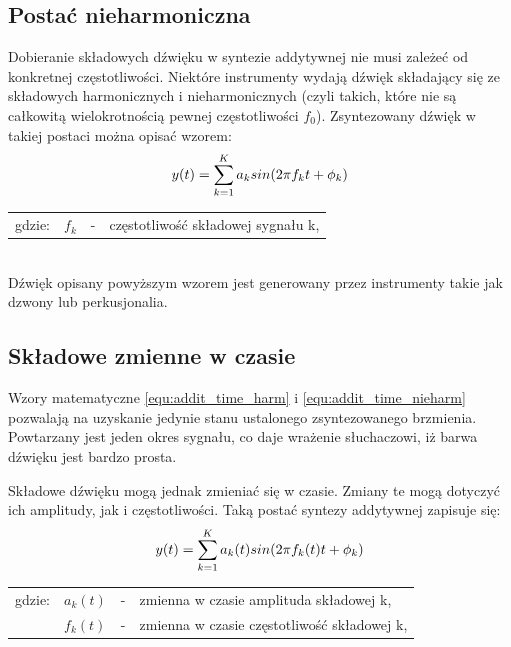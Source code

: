 \subsection{Postać nieharmoniczna} \label{pos_nieharm}
Dobieranie składowych dźwięku w syntezie addytywnej nie musi zależeć od konkretnej częstotliwości. Niektóre instrumenty wydają dźwięk składający się ze składowych harmonicznych i nieharmonicznych (czyli takich, które nie są całkowitą wielokrotnością pewnej częstotliwości $f_{0}$). Zsyntezowany dźwięk w takiej postaci można opisać wzorem:
\begin{equation} \label{equ:addit_time_nieharm}
y(t) = \sum_{k=1}^{K} a_{k}sin(2\pi f_{k}t + \phi_{k})  \\  
\end{equation}
\begin{tabular}{ l l l l}
	gdzie: 	&	$f_{k}$ & - &  częstotliwość składowej sygnału k,\\
\end{tabular} \\

Dźwięk opisany powyższym wzorem jest generowany przez instrumenty takie jak dzwony lub perkusjonalia.

\subsection{Składowe zmienne w czasie}
Wzory matematyczne \ref{equ:addit_time_harm} i \ref{equ:addit_time_nieharm} pozwalają na uzyskanie jedynie stanu ustalonego zsyntezowanego brzmienia. Powtarzany jest jeden okres sygnału, co daje wrażenie słuchaczowi, iż barwa dźwięku jest bardzo prosta.

Składowe dźwięku mogą jednak zmieniać się w czasie. Zmiany te mogą dotyczyć ich amplitudy, jak i częstotliwości.
Taką postać syntezy addytywnej zapisuje się:
\begin{equation} \label{equ:addit_time_zmienne}
y(t) = \sum_{k=1}^{K} a_{k}(t)sin(2\pi f_{k}(t)t + \phi_{k})  \\  
\end{equation}
\begin{tabular}{ l l l l}
	gdzie: & $a_{k}(t)$ &  - & zmienna w czasie amplituda składowej k, \\
	&	$f_{k}(t)$ & - &  zmienna w czasie częstotliwość składowej k, \\
\end{tabular} \\

